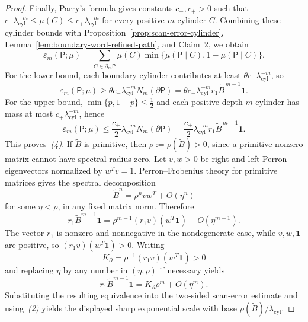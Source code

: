 \documentclass{etds}%
\numberwithin{equation}{section}
\theoremstyle{plain}
\theoremstyle{definition}
\theoremstyle{remark}
\begin{document}
\begin{proof}
Finally, Parry's formula \cite{Parry1964} gives constants $c_-,c_+>0$ such
that
$c_-\lambda_{\mathrm{cyl}}^{-m}\le \mu(C)\le c_+\lambda_{\mathrm{cyl}}^{-m}$
for every positive $m$-cylinder $C$.  Combining these cylinder bounds with
Proposition~\ref{prop:scan-error-cylinder},
Lemma~\ref{lem:boundary-word-refined-path}, and Claim~2, we obtain
\[
\varepsilon_m(\mathsf{P};\mu)
=\sum_{C\in\partial_m\mathsf{P}}\mu(C)
\min\{\mu(\mathsf{P}\mid C),1-\mu(\mathsf{P}\mid C)\}.
\]
For the lower bound, each boundary cylinder contributes at least
$\theta c_-\lambda_{\mathrm{cyl}}^{-m}$, so
\[
\varepsilon_m(\mathsf{P};\mu)
\ge \theta c_-\lambda_{\mathrm{cyl}}^{-m}N_m(\partial\mathsf{P})
= \theta c_-\lambda_{\mathrm{cyl}}^{-m}r_1\widetilde{B}^{\,m-1}\mathbf{1}.
\]
For the upper bound, $\min\{p,1-p\}\le \frac12$ and each positive
depth-$m$ cylinder has mass at most $c_+\lambda_{\mathrm{cyl}}^{-m}$, hence
\[
\varepsilon_m(\mathsf{P};\mu)
\le \frac{c_+}{2}\lambda_{\mathrm{cyl}}^{-m}N_m(\partial\mathsf{P})
= \frac{c_+}{2}\lambda_{\mathrm{cyl}}^{-m}r_1\widetilde{B}^{\,m-1}\mathbf{1}.
\]
This proves~\emph{(4)}.  If $\widetilde{B}$ is primitive, then
$\rho:=\rho(\widetilde B)>0$, since a primitive nonzero matrix cannot have
spectral radius zero.  Let $v,w>0$ be right and left Perron eigenvectors
normalized by $w^T v=1$.  Perron--Frobenius theory for primitive matrices gives
the spectral decomposition
\[
\widetilde B^n=\rho^n v w^T+O(\eta^n)
\]
for some $\eta<\rho$, in any fixed matrix norm.  Therefore
\[
r_1\widetilde B^{m-1}\mathbf 1
=\rho^{m-1}(r_1v)(w^T\mathbf 1)+O(\eta^{m-1}).
\]
The vector $r_1$ is nonzero and nonnegative in the nondegenerate case, while
$v,w,\mathbf 1$ are positive, so $(r_1v)(w^T\mathbf 1)>0$.  Writing
\[
K_\partial=\rho^{-1}(r_1v)(w^T\mathbf 1)>0
\]
and replacing $\eta$ by any number in $(\eta,\rho)$ if necessary yields
\[
r_1\widetilde B^{m-1}\mathbf 1=K_\partial\rho^m+O(\eta^m).
\]
Substituting the resulting equivalence into the two-sided scan-error estimate
and using~\emph{(2)} yields the displayed sharp exponential scale with base
$\rho(\widetilde{B})/\lambda_{\mathrm{cyl}}$.
\end{proof}


\end{document}
